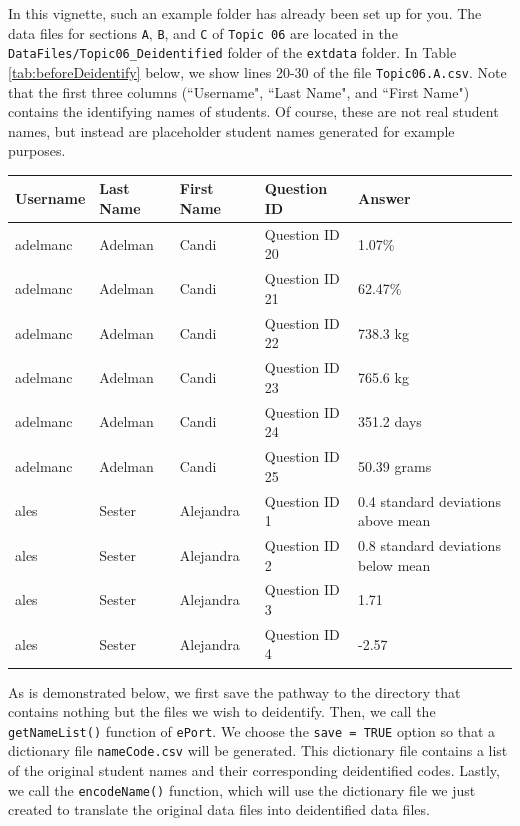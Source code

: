 \documentclass[11pt,a4paper,oldfontcommands,openany]{memoir}
\numberwithin{equation}{section} %
\begin{document}
In this vignette, such an example folder has already been set up for you. The data files for sections \texttt{A}, \texttt{B}, and \texttt{C} of \texttt{Topic 06} are located in the \texttt{DataFiles/Topic06\_Deidentified} folder of the \texttt{extdata} folder. In Table \ref{tab:beforeDeidentify} below, we show lines 20-30 of the file \texttt{Topic06.A.csv}. Note that the first three columns (``Username", ``Last Name", and ``First Name") contains the identifying names of students. Of course, these are not real student names, but instead are placeholder student names generated for example purposes. \\

\begin{center}
\label{tab:beforeDeidentify}
\begin{tabular} { | l | l | l | l | l |}
\hline \textbf{Username} & \textbf{Last Name} & \textbf{First Name} & \textbf{Question ID} & \textbf{Answer} \\
\hline
adelmanc & Adelman & Candi & Question ID 20 & 1.07\% \\
\hline
adelmanc & Adelman & Candi & Question ID 21 & 62.47\% \\
\hline
adelmanc & Adelman & Candi & Question ID 22 & 738.3 kg \\
\hline
adelmanc & Adelman & Candi & Question ID 23 & 765.6 kg\\
\hline
adelmanc & Adelman & Candi & Question ID 24 & 351.2 days \\
\hline
adelmanc & Adelman & Candi & Question ID 25 & 50.39 grams \\
\hline
ales & Sester & Alejandra & Question ID 1 & 0.4 standard deviations above mean \\
\hline
ales & Sester & Alejandra & Question ID 2 & 0.8 standard deviations below mean \\
\hline
ales & Sester & Alejandra & Question ID 3 & 1.71 \\
\hline
ales & Sester & Alejandra & Question ID 4 & -2.57 \\
\hline
\end{tabular}
\end{center}

As is demonstrated below, we first save the pathway to the directory that contains nothing but the files we wish to deidentify. Then, we call the \texttt{getNameList()} function of \texttt{ePort}. We choose the \texttt{save = TRUE} option so that a dictionary file \texttt{nameCode.csv} will be generated. This dictionary file contains a list of the original student names and their corresponding deidentified codes. Lastly, we call the \texttt{encodeName()} function, which will use the dictionary file we just created to translate the original data files into deidentified data files. \\
\end{document}
